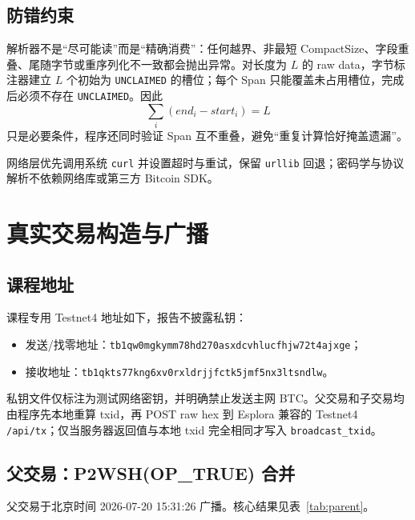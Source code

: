 \documentclass[UTF8,a4paper,zihao=-4]{ctexart}
\begin{document}
\subsection{防错约束}

解析器不是“尽可能读”而是“精确消费”：任何越界、非最短 CompactSize、字段重叠、尾随字节或重序列化不一致都会抛出异常。对长度为 $L$ 的 raw data，字节标注器建立 $L$ 个初始为 \texttt{UNCLAIMED} 的槽位；每个 Span 只能覆盖未占用槽位，完成后必须不存在 \texttt{UNCLAIMED}。因此
\[
\sum_i (end_i-start_i)=L
\]
只是必要条件，程序还同时验证 Span 互不重叠，避免“重复计算恰好掩盖遗漏”。

网络层优先调用系统 \texttt{curl} 并设置超时与重试，保留 \texttt{urllib} 回退；密码学与协议解析不依赖网络库或第三方 Bitcoin SDK。

\section{真实交易构造与广播}

\subsection{课程地址}

课程专用 Testnet4 地址如下，报告不披露私钥：

\begin{itemize}
  \item 发送/找零地址：\texttt{tb1qw0mgkymm78hd270asxdcvhlucfhjw72t4ajxge}；
  \item 接收地址：\texttt{tb1qkts77kng6xv0rxldrjjfctk5jmf5nx3ltsndlw}。
\end{itemize}

私钥文件仅标注为测试网络密钥，并明确禁止发送主网 BTC。父交易和子交易均由程序先本地重算 txid，再 POST raw hex 到 Esplora 兼容的 Testnet4 \texttt{/api/tx}；仅当服务器返回值与本地 txid 完全相同才写入 \texttt{broadcast\_txid}。

\subsection{父交易：P2WSH(OP\_TRUE) 合并}

父交易于北京时间 2026-07-20 15:31:26 广播。核心结果见表~\ref{tab:parent}。
\end{document}
